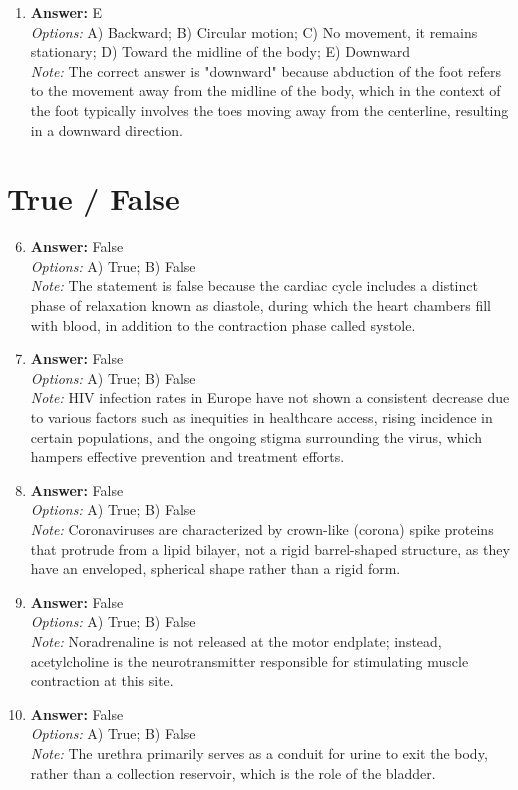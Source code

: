 \documentclass[12pt]{article}
\begin{document}
\begin{enumerate}[label=\arabic*.]
\\ \textit{Note:} The correct answer is based on the fact that fat tissue has a lower water content and higher resistance to electrical current compared to muscle, which contains more water and electrolytes, allowing electricity to travel faster through muscle.
\item \textbf{Answer:} E
\\ \textit{Options:} A) Backward; B) Circular motion; C) No movement, it remains stationary; D) Toward the midline of the body; E) Downward
\\ \textit{Note:} The correct answer is "downward" because abduction of the foot refers to the movement away from the midline of the body, which in the context of the foot typically involves the toes moving away from the centerline, resulting in a downward direction.
\end{enumerate}

\section*{True / False}
\begin{enumerate}[label=\arabic*.]
\setcounter{enumi}{5}
\item \textbf{Answer:} False
\\ \textit{Options:} A) True; B) False
\\ \textit{Note:} The statement is false because the cardiac cycle includes a distinct phase of relaxation known as diastole, during which the heart chambers fill with blood, in addition to the contraction phase called systole.
\item \textbf{Answer:} False
\\ \textit{Options:} A) True; B) False
\\ \textit{Note:} HIV infection rates in Europe have not shown a consistent decrease due to various factors such as inequities in healthcare access, rising incidence in certain populations, and the ongoing stigma surrounding the virus, which hampers effective prevention and treatment efforts.
\item \textbf{Answer:} False
\\ \textit{Options:} A) True; B) False
\\ \textit{Note:} Coronaviruses are characterized by crown-like (corona) spike proteins that protrude from a lipid bilayer, not a rigid barrel-shaped structure, as they have an enveloped, spherical shape rather than a rigid form.
\item \textbf{Answer:} False
\\ \textit{Options:} A) True; B) False
\\ \textit{Note:} Noradrenaline is not released at the motor endplate; instead, acetylcholine is the neurotransmitter responsible for stimulating muscle contraction at this site.
\item \textbf{Answer:} False
\\ \textit{Options:} A) True; B) False
\\ \textit{Note:} The urethra primarily serves as a conduit for urine to exit the body, rather than a collection reservoir, which is the role of the bladder.
\end{enumerate}
\end{document}
